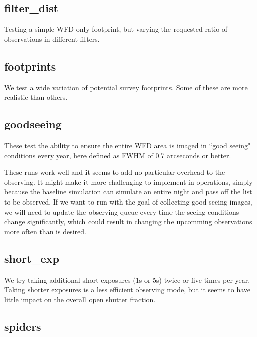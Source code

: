\subsection{filter\_dist}

Testing a simple WFD-only footprint, but varying the requested ratio of observations in different filters.


\subsection{footprints}

We test a wide variation of potential survey footprints. Some of these are more realistic than others. 

\subsection{goodseeing}\label{ss:goodseeing}

These test the ability to ensure the entire WFD area is imaged in ``good seeing" conditions every year, here defined as FWHM of 0.7 arcseconds or better.  

These runs work well and it seems to add no particular overhead to the observing. It might make it more challenging to implement in operations, simply because the baseline simulation can simulate an entire night and pass off the list to be observed. If we want to run with the goal of collecting good seeing images, we will need to update the observing queue every time the seeing conditions change significantly, which could result in changing the upcomming observations more often than is desired.


\subsection{short\_exp}

We try taking additional short exposures (1s or 5s) twice or five times per year. Taking shorter exposures is a less efficient observing mode, but it seems to have little impact on the overall open shutter fraction.

\subsection{spiders}

